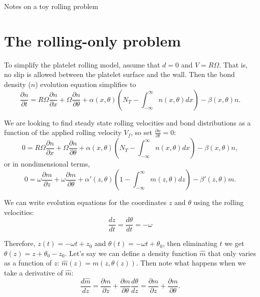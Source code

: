 \documentclass{article}
\begin{document}
\pagestyle{empty}

\begin{center}
{\Large Notes on a toy rolling problem}
\end{center}

\section{The rolling-only problem}
\label{sec:rolling-only-problem}

To simplify the platelet rolling model, assume that $d = 0$ and
$V = R \Omega$. That is, no slip is allowed between the platelet
surface and the wall. Then the bond density ($n$) evolution equation
simplifies to
\begin{equation}
  \label{eq:full-pde}
  \frac{\partial n}{\partial t} = R\Omega \frac{\partial n}{\partial
    x} + \Omega \frac{\partial n}{\partial \theta} + \alpha(x, \theta)
  \left(N_T - \int_{-\infty}^\infty n(x, \theta) dx \right) - \beta(x,
  \theta) n.
\end{equation}

We are looking to find steady state rolling velocities and bond
distributions as a function of the applied rolling velocity $V_f$, so
set $\frac{\partial n}{\partial t} = 0$:
\begin{equation}
  \label{eq:dim-ss}
  0 = R\Omega \frac{\partial n}{\partial x} + \Omega \frac{\partial
    n}{\partial \theta} + \alpha(x, \theta) \left(N_T -
    \int_{-\infty}^\infty n(x, \theta) dx \right) - \beta(x, \theta)n,
\end{equation}
or in nondimensional terms, 
\begin{equation}
  \label{eq:ndim-ss}
  0 = \omega \frac{\partial m}{\partial z} + \omega \frac{\partial
    m}{\partial \theta} + \alpha'(z, \theta) \left(1 -
    \int_{-\infty}^\infty m(z, \theta) dz \right) - \beta'(z,
  \theta)m.
\end{equation}

We can write evolution equations for the coordinates $z$ and $\theta$
using the rolling velocities:
\begin{equation}
  \label{eq:dz-dth}
  \frac{dz}{dt} = \frac{d\theta}{dt} = -\omega
\end{equation}

Therefore, $z(t) = -\omega t + z_0$ and $\theta(t) = -\omega t +
\theta_0$, then eliminating $t$ we get $\theta(z) = z + \theta_0 -
z_0$. Let's say we can define a density function $\hat{m}$ that only
varies as a function of $z$: $\hat{m}(z) = m(z, \theta(z))$. Then note
what happens when we take a derivative of $\hat{m}$:
\begin{equation}
  \frac{d\hat{m}}{dz} = \frac{\partial m}{\partial z} + \frac{\partial
    m}{\partial \theta} \frac{d \theta}{dz} = \frac{\partial m}{\partial
    z} + \frac{\partial m}{\partial\theta}.
\end{equation}
\end{document}
